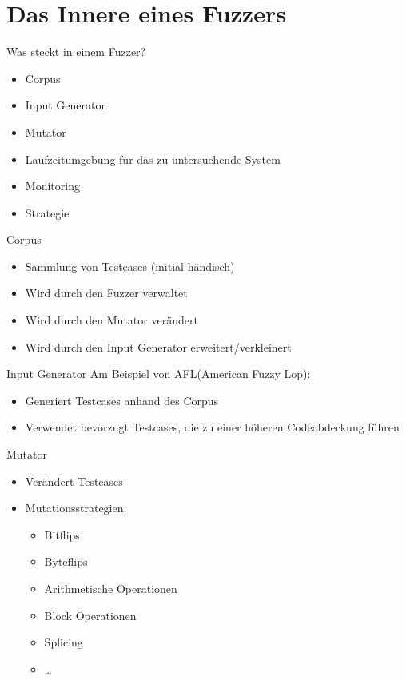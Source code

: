 
\section{Das Innere eines Fuzzers}\label{sec:das-innere-eines-fuzzers}
\begin{frame}{Was steckt in einem Fuzzer?}
    \begin{itemize}
        \item \alert{Corpus}
        \item Input Generator
        \item Mutator
        \item Laufzeitumgebung für das zu untersuchende System
        \item Monitoring
        \item \alert{Strategie}
    \end{itemize}
\end{frame}
\begin{frame}{Corpus}
    \begin{itemize}
        \item Sammlung von Testcases (initial händisch)
        \item Wird durch den Fuzzer verwaltet
        \item Wird durch den Mutator verändert
        \item Wird durch den Input Generator erweitert/verkleinert
    \end{itemize}
\end{frame}
\begin{frame}{Input Generator}
    Am Beispiel von AFL(American Fuzzy Lop):
    \begin{itemize}
        \item Generiert Testcases anhand des Corpus
        \item Verwendet bevorzugt Testcases, die zu einer höheren Codeabdeckung führen
    \end{itemize}
\end{frame}
\begin{frame}{Mutator}
    \begin{itemize}
        \item Verändert Testcases
        \item Mutationsstrategien:
              \begin{itemize}
                  \item Bitflips
                  \item Byteflips
                  \item Arithmetische Operationen
                  \item Block Operationen
                  \item Splicing
                  \item \ldots
              \end{itemize}
    \end{itemize}
\end{frame}
